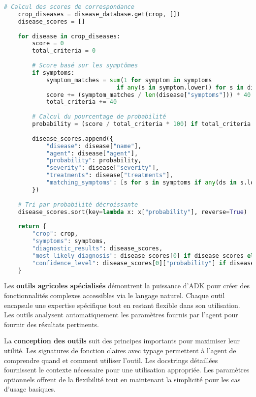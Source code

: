 \begin{lstlisting}[language=Python, caption=Outil de diagnostic des maladies]
    # Calcul des scores de correspondance
    crop_diseases = disease_database.get(crop, [])
    disease_scores = []
    
    for disease in crop_diseases:
        score = 0
        total_criteria = 0
        
        # Score basé sur les symptômes
        if symptoms:
            symptom_matches = sum(1 for symptom in symptoms 
                                if any(s in symptom.lower() for s in disease["symptoms"]))
            score += (symptom_matches / len(disease["symptoms"])) * 40
            total_criteria += 40
        
        # Calcul du pourcentage de probabilité
        probability = (score / total_criteria * 100) if total_criteria > 0 else 0
        
        disease_scores.append({
            "disease": disease["name"],
            "agent": disease["agent"],
            "probability": probability,
            "severity": disease["severity"],
            "treatments": disease["treatments"],
            "matching_symptoms": [s for s in symptoms if any(ds in s.lower() for ds in disease["symptoms"])]
        })
    
    # Tri par probabilité décroissante
    disease_scores.sort(key=lambda x: x["probability"], reverse=True)
    
    return {
        "crop": crop,
        "symptoms": symptoms,
        "diagnostic_results": disease_scores,
        "most_likely_diagnosis": disease_scores[0] if disease_scores else None,
        "confidence_level": disease_scores[0]["probability"] if disease_scores else 0
    }
\end{lstlisting}

Les \textbf{outils agricoles spécialisés} démontrent la puissance d'ADK pour créer des fonctionnalités complexes accessibles via le langage naturel. Chaque outil encapsule une expertise spécifique tout en restant flexible dans son utilisation. Les outils analysent automatiquement les paramètres fournis par l'agent pour fournir des résultats pertinents.

La \textbf{conception des outils} suit des principes importants pour maximiser leur utilité. Les signatures de fonction claires avec typage permettent à l'agent de comprendre quand et comment utiliser l'outil. Les docstrings détaillées fournissent le contexte nécessaire pour une utilisation appropriée. Les paramètres optionnels offrent de la flexibilité tout en maintenant la simplicité pour les cas d'usage basiques.

